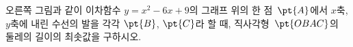 \noindent\begin{minipage}[t]{0.58\linewidth}\vspace{0pt}\raggedright 오른쪽 그림과 같이 이차함수 $y=x^2-6x+9$의 그래프 위의 한 점~$\pt{A}$에서 $x$축, $y$축에 내린 수선의 발을 각각 $\pt{B}$, $\pt{C}$라 할 때, 직사각형~$\pt{OBAC}$의 둘레의 길이의 최솟값을 구하시오. \end{minipage}\hfill\begin{minipage}[t]{0.4\linewidth}\vspace{0pt}\centering \resizebox{\ifdim\width>\linewidth\linewidth\else\width\fi}{!}{}\end{minipage}\par
